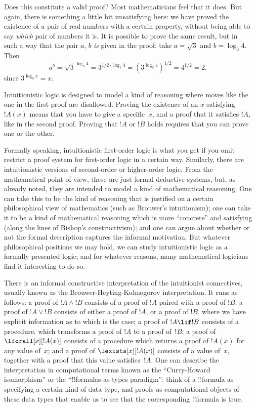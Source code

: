 \documentclass[../../../include/open-logic-section]{subfiles}
\begin{document}
Does this constitute a valid proof? Most mathematicians feel that it
does. But again, there is something a little bit unsatisfying here: we
have proved the existence of a pair of real numbers with a certain
property, without being able to say \emph{which} pair of numbers it
is.  It is possible to prove the same result, but in such a way that
the pair $a$, $b$ \emph{is} given in the proof: take $a = \sqrt{3}$
and $b = \log_3 4$. Then
\[
a^b = \sqrt{3}^{\log_3 4} = 3^{1/2 \cdot \log_3 4} = (3^{\log_3
  4})^{1/2} = 4^{1/2}= 2,
\]
since $3^{\log_3 x} = x$.

Intuitionistic logic is designed to model a kind of reasoning where
moves like the one in the first proof are disallowed. Proving the
existence of an $x$ satisfying~$!A(x)$ means that you have to give a
specific~$x$, and a proof that it satisfies $!A$, like in the second
proof. Proving that $!A$ or $!B$ holds requires that you can prove one
or the other.

Formally speaking, intuitionistic first-order logic is what you get if
you omit restrict a proof system for first-order logic in a certain
way. Similarly, there are intuitionistic versions of second-order or
higher-order logic. From the mathematical point of view, these are
just formal deductive systems, but, as already noted, they are
intended to model a kind of mathematical reasoning. One can take this
to be the kind of reasoning that is justified on a certain
philosophical view of mathematics (such as Brouwer's intuitionism);
one can take it to be a kind of mathematical reasoning which is more
``concrete'' and satisfying (along the lines of Bishop's
constructivism); and one can argue about whether or not the formal
description captures the informal motivation. But whatever
philosophical positions we may hold, we can study intuitionistic logic
as a formally presented logic; and for whatever reasons, many
mathematical logicians find it interesting to do so.

There is an informal constructive interpretation of the intuitionist
connectives, usually known as the Brouwer-Heyting-Kolmogorov
interpretation. It runs as follows: a proof of $!A \land !B$ consists
of a proof of $!A$ paired with a proof of $!B$; a proof of $!A \lor
!B$ consists of either a proof of $!A$, or a proof of $!B$, where we
have explicit information as to which is the case; a proof of $!A \lif
!B$ consists of a procedure, which transforms a proof of $!A$ to a
proof of~$!B$; a proof of $\lforall[x][!A(x)]$ consists of a procedure
which returns a proof of $!A(x)$ for any value of~$x$; and a proof of
$\lexists[x][!A(x)]$ consists of a value of~$x$, together with a proof
that this value satisfies~$!A$. One can describe the interpretation in
computational terms known as the ``Curry-Howard isomorphism'' or the
``!!{formula}s-as-types paradigm'': think of a !!{formula} as
specifying a certain kind of data type, and proofs as computational
objects of these data types that enable us to see that the
corresponding !!{formula} is true.
\end{document}
